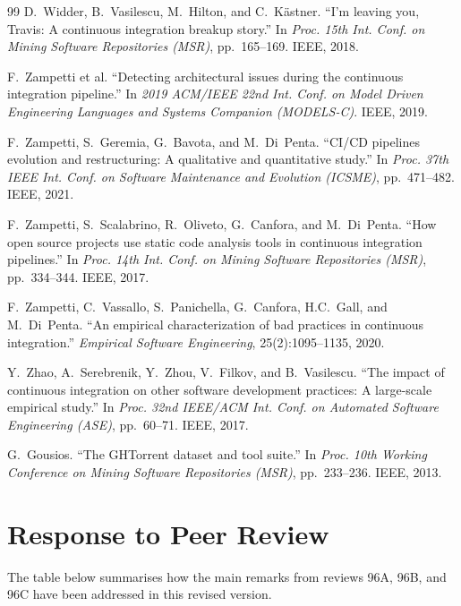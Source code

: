 \documentclass[12pt, a4paper]{article}
\begin{document}
\begin{thebibliography}{99}
D.~Widder, B.~Vasilescu, M.~Hilton, and C.~K{\"a}stner.
``I'm leaving you, Travis: A continuous integration breakup story.''
In \emph{Proc. 15th Int. Conf. on Mining Software Repositories (MSR)},
pp.~165--169. IEEE, 2018.

F.~Zampetti et al.
``Detecting architectural issues during the continuous integration pipeline.''
In \emph{2019 ACM/IEEE 22nd Int. Conf. on Model Driven Engineering Languages and
Systems Companion (MODELS-C)}. IEEE, 2019.

F.~Zampetti, S.~Geremia, G.~Bavota, and M.~Di~Penta.
``CI/CD pipelines evolution and restructuring: A qualitative and quantitative study.''
In \emph{Proc. 37th IEEE Int. Conf. on Software Maintenance and Evolution (ICSME)},
pp.~471--482. IEEE, 2021.

F.~Zampetti, S.~Scalabrino, R.~Oliveto, G.~Canfora, and M.~Di~Penta.
``How open source projects use static code analysis tools in continuous integration
pipelines.''
In \emph{Proc. 14th Int. Conf. on Mining Software Repositories (MSR)},
pp.~334--344. IEEE, 2017.

F.~Zampetti, C.~Vassallo, S.~Panichella, G.~Canfora, H.C.~Gall, and M.~Di~Penta.
``An empirical characterization of bad practices in continuous integration.''
\emph{Empirical Software Engineering}, 25(2):1095--1135, 2020.

Y.~Zhao, A.~Serebrenik, Y.~Zhou, V.~Filkov, and B.~Vasilescu.
``The impact of continuous integration on other software development practices:
A large-scale empirical study.''
In \emph{Proc. 32nd IEEE/ACM Int. Conf. on Automated Software Engineering (ASE)},
pp.~60--71. IEEE, 2017.

G.~Gousios.
``The GHTorrent dataset and tool suite.''
In \emph{Proc. 10th Working Conference on Mining Software Repositories (MSR)},
pp.~233--236. IEEE, 2013.

\end{thebibliography}

\newpage
\section*{Response to Peer Review}
 
The table below summarises how the main remarks from reviews 96A, 96B, and 96C have
been addressed in this revised version.
 
\end{document}
